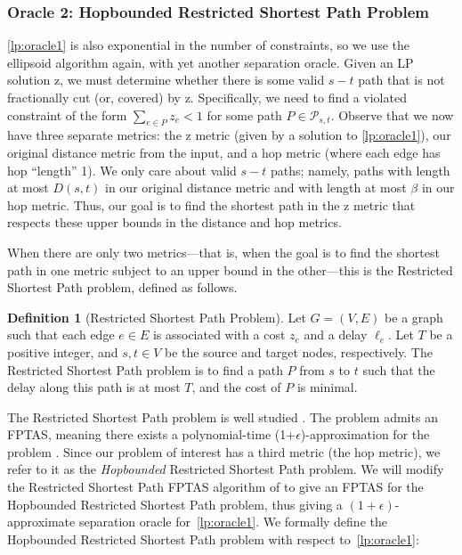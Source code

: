 \documentclass{article}
\theoremstyle{definition}
\newtheorem{definition}{Definition}
\theoremstyle{remark}
\begin{document}
\subsubsection{Oracle 2: Hopbounded Restricted Shortest Path Problem}
\ref{lp:oracle1} is also exponential in the number of constraints, so we use the ellipsoid algorithm again, with yet another separation oracle. Given an LP solution $\bm{\mathrm{z}}$, we must determine whether there is some valid $s-t$ path that is not fractionally cut (or, covered) by $\bm{\mathrm{z}}$. Specifically, we need to find a violated constraint of the form $\sum_{e \in P} z_e < 1$ for some path $P \in \mathcal{P}_{s,t}$. Observe that we now have three separate metrics: the $\bm{\mathrm{z}}$ metric (given by a solution to \ref{lp:oracle1}), our original distance metric from the input, and a hop metric (where each edge has hop ``length'' 1). We only care about valid $s-t$ paths; namely, paths with length at most $D(s,t)$ in our original distance metric and with length at most $\beta$ in our hop metric. Thus, our goal is to find the shortest path in the $\bm{\mathrm{z}}$ metric that respects these upper bounds in the distance and hop metrics. 

When there are only two metrics---that is, when the goal is to find the shortest path in one metric subject to an upper bound in the other---this is the Restricted Shortest Path problem, defined as follows.

\begin{definition} [Restricted Shortest Path Problem]
    Let $G = (V,E)$ be a graph such that each edge $e \in E$ is associated with a cost $z_e$ and a delay $\ell_e$. Let $T$ be a positive integer, and $s,t \in V$ be the source and target nodes, respectively. The Restricted Shortest Path problem is to find a path $P$ from $s$ to $t$ such that the delay along this path is at most $T$, and the cost of $P$ is minimal.
\end{definition}

The Restricted Shortest Path problem is well studied \cite{Has92, War87, Phi93, XZTT08, HK18}. The problem admits an FPTAS, meaning there exists a polynomial-time (1+$\epsilon$)-approximation for the problem \cite{LR01}. Since our problem of interest has a third metric (the hop metric), we refer to it as the \textit{Hopbounded} Restricted Shortest Path problem. We \iflong will \else \fi modify the Restricted Shortest Path FPTAS algorithm of \cite{LR01} to give an FPTAS for the Hopbounded Restricted Shortest Path problem, thus giving a $(1+\epsilon)$-approximate separation oracle for~\ref{lp:oracle1}. We formally define the Hopbounded Restricted Shortest Path problem with respect to~\ref{lp:oracle1}:
\end{document}
